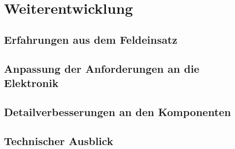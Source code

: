 \chapter{Weiterentwicklung}\label{cha:Weiterentwicklung}

\section{Erfahrungen aus dem Feldeinsatz}

\section{Anpassung der Anforderungen an die Elektronik}

\section{Detailverbesserungen an den Komponenten}

\section{Technischer Ausblick}